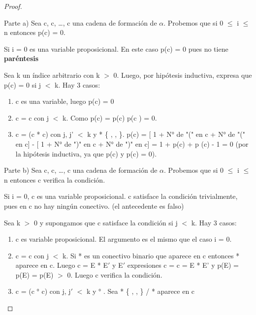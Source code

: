 \begin{proof}
$\;$

Parte a) Sea c, c, \ldots, c una cadena de formaci\'on de $\alpha$. Probemos que si 0 $\leq$ i $\leq$ n entonces p(c) = 0.

Si i = 0 es una variable proposicional. En este caso p(c) = 0 pues no tiene \textbf{par\'entesis}

Sea k un \'indice arbitrario con k $>$ 0. Luego, por hip\'otesis inductiva, expresa que p(c) = 0 si j $<$ k. Hay 3 casos:

\begin{enumerate}
	\item c es una variable, luego p(c) = 0
	\item c = \cneg c con j $<$ k. Como p(c) = p(c) \then p(c			) = 0.
	\item c = (c c) con j, j' $<$ k y * \cin \{ \cland, \clor, \then 		\}. p(c) = [ 1 + N° de "(" en c + N° de "(" en c] - [ 1 + N° de ")" 	en c + N° de ")" en c] = 1 + p(c) + p (c) - 1 = 0 (por la 		hip\'otesis inductiva, ya que p(c) y p(c) = 0).
\end{enumerate}

Parte b) Sea c, c, \ldots, c una cadena de formaci\'on de $\alpha$.
Probemos que si 0 $\leq$ i $\leq$ n entonces c verifica la condici\'on.

Si i = 0, c es una variable proposicional. c satisface la condici\'on trivialmente, pues en c no hay ning\'un conectivo. (el antecedente es falso)

Sea k $>$ 0 y supongamos que c satisface la condici\'on si j $<$ k. Hay 3 casos:

\begin{enumerate}
	\item c es variable proposicional. El argumento es el mismo que el caso i = 0.
	\item c = \cneg c con j $<$ k. Si * es un conectivo binario que aparece en c		 entonces * aparece en c\subi{j}. Luego c = E * E$'$ y E$'$ expresiones 			\then \cneg c = c = \cneg E * E' y p(\cneg E) = \cneg p(E) = p(E) $>$ 0. Luego 	c verifica la condici\'on.
	\item c = (c ° c) con j, j$'$ $<$ k y ° \cin { \cland, \clor, 			\then}. Sea * \cin \{ \clor, \cland, \then \} / * aparece en c


\end{enumerate}
\end{proof}
